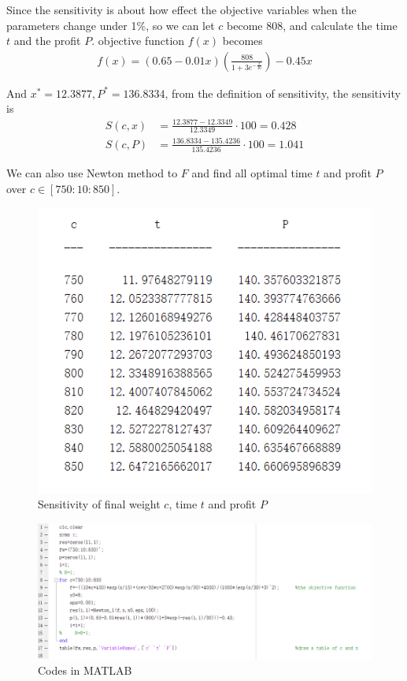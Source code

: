 \documentclass{report}
\begin{document}
\begin{spacing}{1.3541667}
Since the sensitivity is about how effect the objective variables when the parameters change under 1\%, 
so we can let $c$ become 808, and calculate the time $t$ and the profit $P$. 
objective function $f(x)$ becomes
\begin{align*}
    f(x)=(0.65-0.01x)(\frac{808}{1+3e^{-\frac{x}{30}}})-0.45x
\end{align*}

And $x^*=12.3877, P^*=136.8334$, from the definition of sensitivity, the sensitivity is
\begin{align*}
    S(c,x)&=\frac{12.3877-12.3349}{12.3349}\cdot 100=0.428\\
    S(c,P)&=\frac{136.8334-135.4236}{135.4236}\cdot 100 =1.041
\end{align*}

We can also use Newton method to $F$ and find all optimal time $t$ and profit $P$ over 
$c\in [750:10:850]$. 

\begin{figure}[htbp]
    \centering
    \includegraphics[scale=0.8]{figs/1(c)_1.jpg}
    \caption*{Sensitivity of final weight $c$, time $t$ and profit $P$}
\end{figure}

\begin{figure}[htbp]
    \centering
    \includegraphics[scale=0.6]{figs/1(c)_2.jpg}
    \caption*{Codes in MATLAB}
\end{figure}


\end{spacing}
\end{document}
